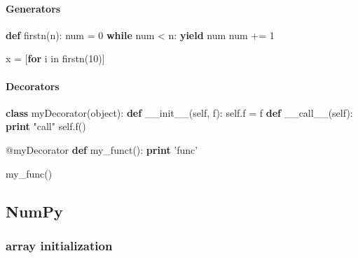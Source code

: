 \documentclass[]{article}
\newenvironment{Shaded}{}{}
\newcommand{\KeywordTok}[1]{\textcolor[rgb]{0.00,0.44,0.13}{\textbf{{#1}}}}
\newcommand{\DataTypeTok}[1]{\textcolor[rgb]{0.56,0.13,0.00}{{#1}}}
\newcommand{\DecValTok}[1]{\textcolor[rgb]{0.25,0.63,0.44}{{#1}}}
\newcommand{\StringTok}[1]{\textcolor[rgb]{0.25,0.44,0.63}{{#1}}}
\newcommand{\OtherTok}[1]{\textcolor[rgb]{0.00,0.44,0.13}{{#1}}}
\newcommand{\NormalTok}[1]{{#1}}
\begin{document}
\paragraph{Generators}

\begin{Shaded}
\begin{Highlighting}[]
\KeywordTok{def} \NormalTok{firstn(n):}
    \NormalTok{num = }\DecValTok{0}
    \KeywordTok{while} \NormalTok{num < n:}
        \KeywordTok{yield} \NormalTok{num}
        \NormalTok{num += }\DecValTok{1}

\NormalTok{x = [}\KeywordTok{for} \NormalTok{i in firstn(}\DecValTok{10}\NormalTok{)]}
\end{Highlighting}
\end{Shaded}

\paragraph{Decorators}

\begin{Shaded}
\begin{Highlighting}[]
\KeywordTok{class} \NormalTok{myDecorator(}\DataTypeTok{object}\NormalTok{):}
    \KeywordTok{def} \OtherTok{__init__}\NormalTok{(}\OtherTok{self}\NormalTok{, f):}
        \OtherTok{self}\NormalTok{.f = f}
    \KeywordTok{def} \OtherTok{__call__}\NormalTok{(}\OtherTok{self}\NormalTok{):}
        \KeywordTok{print} \StringTok{"call"}
        \OtherTok{self}\NormalTok{.f()}

\OtherTok{@myDecorator}
\KeywordTok{def} \NormalTok{my_funct():}
    \KeywordTok{print} \StringTok{'func'}

\NormalTok{my_func()}
\end{Highlighting}
\end{Shaded}

\subsection{NumPy}

\subsubsection{array initialization}
\end{document}
